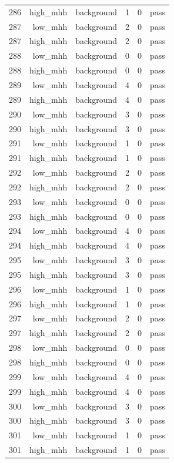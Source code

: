 \begin{table}[htbp]
{\begin{tabular}{lrrrrr}
286 & high\_mhh & background & 1 & 0 & pass \\
287 & low\_mhh & background & 2 & 0 & pass \\
287 & high\_mhh & background & 2 & 0 & pass \\
288 & low\_mhh & background & 0 & 0 & pass \\
288 & high\_mhh & background & 0 & 0 & pass \\
289 & low\_mhh & background & 4 & 0 & pass \\
289 & high\_mhh & background & 4 & 0 & pass \\
290 & low\_mhh & background & 3 & 0 & pass \\
290 & high\_mhh & background & 3 & 0 & pass \\
291 & low\_mhh & background & 1 & 0 & pass \\
291 & high\_mhh & background & 1 & 0 & pass \\
292 & low\_mhh & background & 2 & 0 & pass \\
292 & high\_mhh & background & 2 & 0 & pass \\
293 & low\_mhh & background & 0 & 0 & pass \\
293 & high\_mhh & background & 0 & 0 & pass \\
294 & low\_mhh & background & 4 & 0 & pass \\
294 & high\_mhh & background & 4 & 0 & pass \\
295 & low\_mhh & background & 3 & 0 & pass \\
295 & high\_mhh & background & 3 & 0 & pass \\
296 & low\_mhh & background & 1 & 0 & pass \\
296 & high\_mhh & background & 1 & 0 & pass \\
297 & low\_mhh & background & 2 & 0 & pass \\
297 & high\_mhh & background & 2 & 0 & pass \\
298 & low\_mhh & background & 0 & 0 & pass \\
298 & high\_mhh & background & 0 & 0 & pass \\
299 & low\_mhh & background & 4 & 0 & pass \\
299 & high\_mhh & background & 4 & 0 & pass \\
300 & low\_mhh & background & 3 & 0 & pass \\
300 & high\_mhh & background & 3 & 0 & pass \\
301 & low\_mhh & background & 1 & 0 & pass \\
301 & high\_mhh & background & 1 & 0 & pass \\

\end{tabular}}
\end{table}

